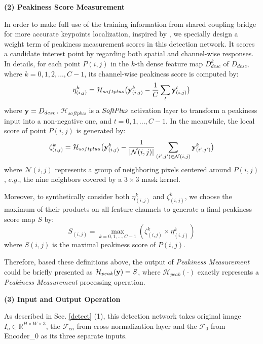 \documentclass[journal]{IEEEtran}
\begin{document}
\textbf{(2) Peakiness Score Measurement}

In order to make full use of the training information from shared coupling bridge for more accurate keypoints localization, inspired by \cite{D2net,aslfeat}, 
we specially design a weight term of peakiness measurement scores in this detection network. 
It scores a candidate interest point by regarding both spatial and channel-wise responses. In details, for each point $P(i,j)$ in the $k$-th dense feature map ${ D^{k}_{desc}}$ of $D_{desc}$, where $k=0, 1, 2,…, C-1$, its channel-wise peakiness score is computed by:
\begin{equation}\label{2}
\eta_{(i,j)}^k=\mathcal{H}_{softplus}\big(\boldsymbol{\rm y}_{(i,j)}^k-\frac{1}{C}\mathop{\sum}\limits_t\boldsymbol{\rm y}_{(i,j)}^{t}\big)
\end{equation}
where $\boldsymbol{\rm y}=D_{desc}$, 
$\mathcal{H}_{softplus}$ is a $\emph{SoftPlus}$ activation layer to transform a peakiness input into a non-negative one, and $t=0,1,...,C-1$. In the meanwhile, the local score of point $P(i,j)$ is generated by:
\begin{equation}\label{3}       \zeta_{(i,j)}^{k}=\mathcal{H}_{softplus}\big(\boldsymbol{\rm y}_{(i,j)}^{k}-\frac{1}{|\mathcal N(i,j)|}\mathop{\sum}\limits_{(i^{\prime},j^{\prime})\in \mathcal N(i,j)}{\boldsymbol{\rm y}_{(i^{\prime},j^{\prime})}^{k}}\big)
\end{equation}
where $\mathcal N(i,j)$ represents a group of neighboring pixels centered around $P(i,j)$, $e.g.$, the nine neighbors covered by a $3\times 3$ mask kernel. 

Moreover, to synthetically consider both $\eta_{(i,j)}^k$ and $\zeta_{(i,j)}^{k}$, we choose the maximum of their products on all feature channels to generate a final peakiness score map $S$ by:
\begin{equation}\label{4}
        S_{(i,j)}=\mathop{max}\limits_{k=0,1,...,C-1}(\zeta_{(i,j)}^{k}\times \eta_{(i,j)}^{k})
\end{equation}
where $S(i,j)$ is the maximal peakiness score of $P(i,j)$.

Therefore, based these definitions above, the output of \emph{Peakiness Measurement} could be briefly presented as $\mathcal{H}_{peak}(\boldsymbol{\rm y})=S$, where $\mathcal{H}_{peak}(\cdot)$ exactly represents a \emph{Peakiness Measurement} processing operation.

\textbf{(3) Input and Output Operation}

As described in Sec. \ref{detect} (1), 
this detection network takes original image $I_o \in \mathbb{R}^{H\times W \times 3}$, the $\mathcal{F}_{cn}$ from cross normalization layer and the $\mathcal{F}_{0}$ from Encoder\_0 as its three separate inputs. 
\end{document}
